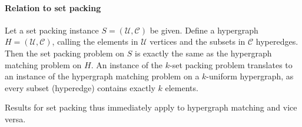 \paragraph{Relation to set packing} Let a set packing instance $S = (\mathcal{U},\mathcal{C})$ be given. Define a hypergraph $H = (\mathcal{U}, \mathcal{C})$, calling the elements in $\mathcal{U}$ vertices and the subsets in $\mathcal{C}$ hyperedges. Then the set packing problem on $S$ is exactly the same as the hypergraph matching problem on $H$. An instance of the $k$-set packing problem translates to an instance of the hypergraph matching problem on a $k$-uniform hypergraph, as every subset (hyperedge) contains exactly $k$ elements. %

Results for set packing thus immediately apply to hypergraph matching and vice versa.

